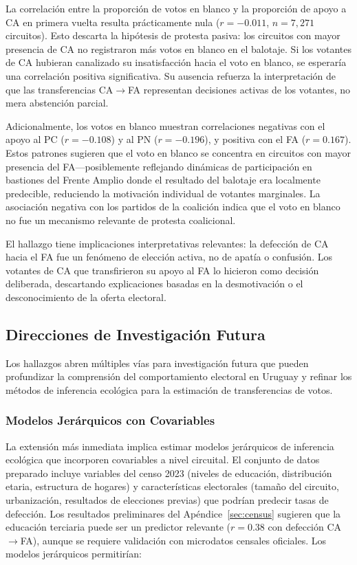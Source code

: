 La correlación entre la proporción de votos en blanco y la proporción de apoyo a CA en primera vuelta resulta prácticamente nula ($r = -0.011$, $n = 7{,}271$ circuitos). Esto descarta la hipótesis de protesta pasiva: los circuitos con mayor presencia de CA no registraron más votos en blanco en el balotaje. Si los votantes de CA hubieran canalizado su insatisfacción hacia el voto en blanco, se esperaría una correlación positiva significativa. Su ausencia refuerza la interpretación de que las transferencias CA$\to$FA representan decisiones activas de los votantes, no mera abstención parcial.

Adicionalmente, los votos en blanco muestran correlaciones negativas con el apoyo al PC ($r = -0.108$) y al PN ($r = -0.196$), y positiva con el FA ($r = 0.167$). Estos patrones sugieren que el voto en blanco se concentra en circuitos con mayor presencia del FA---posiblemente reflejando dinámicas de participación en bastiones del Frente Amplio donde el resultado del balotaje era localmente predecible, reduciendo la motivación individual de votantes marginales. La asociación negativa con los partidos de la coalición indica que el voto en blanco no fue un mecanismo relevante de protesta coalicional.

El hallazgo tiene implicaciones interpretativas relevantes: la defección de CA hacia el FA fue un fenómeno de elección activa, no de apatía o confusión. Los votantes de CA que transfirieron su apoyo al FA lo hicieron como decisión deliberada, descartando explicaciones basadas en la desmotivación o el desconocimiento de la oferta electoral.

\subsection{Direcciones de Investigación Futura}
\label{sec:discusion_futuro}

Los hallazgos abren múltiples vías para investigación futura que pueden profundizar la comprensión del comportamiento electoral en Uruguay y refinar los métodos de inferencia ecológica para la estimación de transferencias de votos.

\subsubsection{Modelos Jerárquicos con Covariables}

La extensión más inmediata implica estimar modelos jerárquicos de inferencia ecológica que incorporen covariables a nivel circuital. El conjunto de datos preparado incluye variables del censo 2023 (niveles de educación, distribución etaria, estructura de hogares) y características electorales (tamaño del circuito, urbanización, resultados de elecciones previas) que podrían predecir tasas de defección. Los resultados preliminares del Apéndice~\ref{sec:census} sugieren que la educación terciaria puede ser un predictor relevante ($r = 0.38$ con defección CA$\to$FA), aunque se requiere validación con microdatos censales oficiales. Los modelos jerárquicos permitirían:


